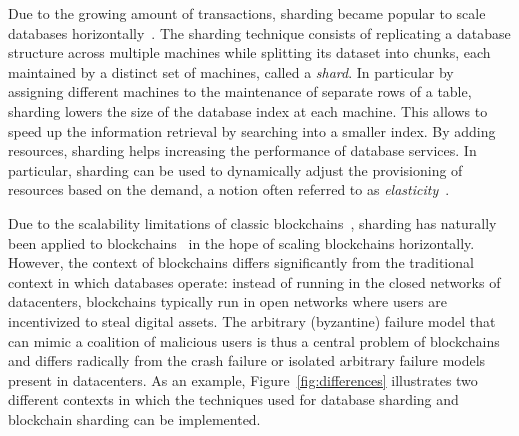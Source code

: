 \documentclass[11pt,dvipdfm]{article}
\newcommand{\vincent}[1]{\emph{Vincent: #1}}%
\newcommand{\deepal}[1]{\emph{Deepal: #1}}%
\begin{document}
Due to the growing amount of transactions, sharding became popular to scale databases horizontally~\cite{CDG08,CDE13}. 
The sharding technique consists of replicating a database structure across multiple machines while splitting its dataset into chunks, 
each maintained by a distinct set of machines, called a \emph{shard}. 
In particular by assigning different machines to the maintenance of separate rows of a table, 
sharding lowers the size of the database index at each machine. 
This allows to speed up the information retrieval by searching into a smaller index.
By adding resources, sharding helps increasing the performance of database services.
In particular, sharding can be used to dynamically adjust the  provisioning of resources based on the demand, 
a notion often referred to as \emph{elasticity}~\cite{10.1145/3477132.3483552,SMA14,TMS14,AMH16}.

Due to the scalability limitations of classic blockchains~\cite{Nak08,Woo15}, sharding has naturally been applied to blockchains~\cite{LNZ16,KJGG17,ZMR18} in the hope of scaling blockchains horizontally.
However, the context of blockchains differs significantly from the traditional context in which databases operate: 
instead of running in the closed networks of datacenters, blockchains typically run in open networks 
where users are incentivized to steal digital assets.
The arbitrary (byzantine) failure model that can mimic a coalition of malicious users is thus a central problem of 
blockchains and differs radically from the crash failure or isolated arbitrary failure models present in datacenters.
As an example, Figure~\ref{fig:differences} illustrates two different contexts in which the techniques used for database 
sharding and blockchain sharding can be implemented.
\end{document}
